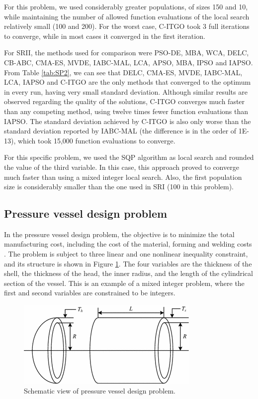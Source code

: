 For this problem, we used considerably greater populations, of sizes 150 and 10, while maintaining the number of allowed function evaluations of the local search relatively small (100 and 200). For the worst case, C-ITGO took 3 full iterations to converge, while in most cases it converged in the first iteration.

For SRII, the methods used for comparison were PSO-DE, MBA, WCA, DELC, CB-ABC, CMA-ES, MVDE, IABC-MAL, LCA, APSO, MBA, IPSO and IAPSO. From Table \ref{tab:SP2}, we can see that DELC, CMA-ES, MVDE, IABC-MAL, LCA, IAPSO and C-ITGO are the only methods that converged to the optimum in every run, having very small standard deviation. Although similar results are observed regarding the quality of the solutions, C-ITGO converges much faster than any competing method, using twelve times fewer function evaluations than IAPSO. The standard deviation achieved by C-ITGO is also only worse than the standard deviation reported by IABC-MAL (the difference is in the order of 1E-13), which took 15,000 function evaluations to converge.



For this specific problem, we used the SQP algorithm as local search and rounded the value of the third variable. In this case, this approach proved to converge much faster than using a mixed integer local search. Also, the first population size is considerably smaller than the one used in SRI (100 in this problem).



\subsection{Pressure vessel design problem}

In the pressure vessel design problem, the objective is to minimize the total manufacturing cost, including the cost of the material, forming and welding costs \citep{PV}. The problem is subject to three linear and one nonlinear inequality constraint, and its structure is shown in Figure \ref{fig:PV}. The four variables are the thickness of the shell, the thickness of the head, the inner radius, and the length of the cylindrical section of the vessel. This is an example of a mixed integer problem, where the first and second variables are constrained to be integers.


\begin{figure}[h]
\begin{center}
\includegraphics[scale=0.6]{Imgs/PV.png}
\end{center}
\captionsetup{justification=centering}
\caption{Schematic view of pressure vessel design problem.}\label{fig:PV}
\end{figure}



